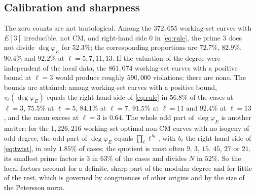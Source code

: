 \documentclass[11pt]{amsart}
\theoremstyle{definition}
\newcommand{\degphi}{\deg\varphi_E}
\begin{document}
\begin{table}[ht]\centering\footnotesize

\caption{The Euler-factor rule with PARI's factors at all primes: curves with $E[\ell]$ irreducible, not CM, with a positive bound in \eqref{eq:rule}; violations; equality rate among them; violations when the $\mathrm{III}$ terms are added at every prime (``$+\mathrm{III}$''); and the same quantities without the weights at $q=\ell$ (``no $q=\ell$'').}\label{tab:uniform}
\end{table}

\subsection{Calibration and sharpness}\label{sec:sharp}
The zero counts are not tautological. Among the $372{,}655$ working-set curves with $E[3]$ irreducible, not CM, and right-hand side $0$ in \eqref{eq:rule}, the prime $3$ does not divide $\degphi$ for $52.3\%$; the corresponding proportions are $72.7\%$, $82.9\%$, $90.4\%$ and $92.2\%$ at $\ell=5,7,11,13$. If the valuation of the degree were independent of the local data, the $861{,}074$ working-set curves with a positive bound at $\ell=3$ would produce roughly $590{,}000$ violations; there are none. The bounds are attained: among working-set curves with a positive bound, $v_\ell(\degphi)$ equals the right-hand side of \eqref{eq:rule} in $56.8\%$ of the cases at $\ell=3$, $75.5\%$ at $\ell=5$, $84.1\%$ at $\ell=7$, $91.5\%$ at $\ell=11$ and $92.4\%$ at $\ell=13$, and the mean excess at $\ell=3$ is $0.64$. The whole odd part of $\degphi$ is another matter: for the $1{,}226{,}216$ working-set optimal non-CM curves with no isogeny of odd degree, the odd part of $\degphi$ equals $\prod_\ell\ell^{\,b_\ell}$, with $b_\ell$ the right-hand side of \eqref{eq:twist}, in only $1.85\%$ of cases; the quotient is most often $9$, $3$, $15$, $45$, $27$ or $21$, its smallest prime factor is $3$ in $63\%$ of the cases and divides $N$ in $52\%$. So the local factors account for a definite, sharp part of the modular degree and for little of the rest, which is governed by congruences of other origins and by the size of the Petersson norm.
\end{document}
